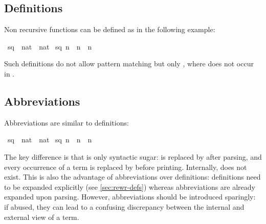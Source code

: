 \begin{isabellebody}
\begin{isamarkuptext}
\subsection{Definitions}

Non recursive functions can be defined as in the following example:%
\end{isamarkuptext}%
\isamarkuptrue%
\isamarkupfalse%
\ sq\ {}{}\ {}nat\ {}\ nat{}\ \isanewline
{}sq\ n\ {}\ n\ {}\ n{}%
\begin{isamarkuptext}%
Such definitions do not allow pattern matching but only
, where  does not occur in .

\subsection{Abbreviations}

Abbreviations are similar to definitions:%
\end{isamarkuptext}%
\isamarkuptrue%
\isamarkupfalse%
\ sq{}\ {}{}\ {}nat\ {}\ nat{}\ \isanewline
{}sq{}\ n\ {}{}\ n\ {}\ n{}%
\begin{isamarkuptext}%
The key difference is that  is only syntactic sugar:
 is replaced by \mbox{} after parsing, and every
occurrence of a term  is replaced by \mbox{} before
printing.  Internally,  does not exist.  This is also the
advantage of abbreviations over definitions: definitions need to be expanded
explicitly (see \autoref{sec:rewr-defs}) whereas abbreviations are already
expanded upon parsing. However, abbreviations should be introduced sparingly:
if abused, they can lead to a confusing discrepancy between the internal and
external view of a term.


\end{isamarkuptext}
\end{isabellebody}
